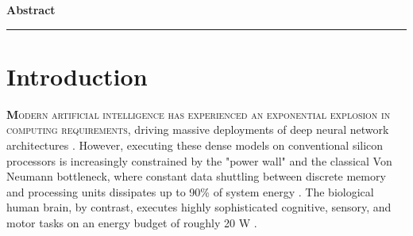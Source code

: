 \documentclass[11pt]{article}
\newcommand{\sectionlead}[2]{\noindent\lettrine[lines=2,lhang=0.08,nindent=0.12em]{\textcolor{IEEEblue}{\bfseries #1}}{\hspace{0.03em}#2}}
\begin{document}
\begin{titlepage}
    \thispagestyle{plain}
    \begin{center}
        \null
        \vspace{1.2cm}
        {\color{IEEEblue}\LARGE\bfseries Abstract\par}
        \vspace{0.25cm}
        {\color{IEEEorange}\rule{0.22\textwidth}{0.8pt}\par}
    \end{center}
    \vspace{0.45cm}

    \begin{abstract}
    The rise of modern deep learning has highlighted severe limitations within the traditional Von Neumann computer architecture, primarily governed by memory transfer bottlenecks and unsustainable power requirements. Neuromorphic architectures utilize Spiking Neural Networks (SNNs) to represent information as sparse, asynchronous temporal spikes, co-locating processing and memory within physical neuron and synapse models. This paper analyzes the core mathematical principles of SNNs, details the microelectronic physics of memristive devices representing physical synapses, and contrasts state-of-the-art brain-inspired hardware platforms, including IBM TrueNorth, Intel Loihi 1 \& 2, SpiNNaker 1 \& 2, and the brain-scale Intel Hala Point chassis. Furthermore, it discusses edge AI and robotic applications that demonstrate major gains in energy-delay product. Emerging frontiers such as integrated photonic neuromorphic circuits and quantum neuromorphic frameworks are reviewed alongside systematic bottlenecks, highlighting the technological roadmap for post-Moore computing.
    \end{abstract}

    \vfill
\end{titlepage}

\clearpage
\setcounter{page}{2}
\tableofcontents
\clearpage
\listoffigures
\clearpage
\listoftables
\clearpage
{}
\setcounter{page}{1}


\section{Introduction}
\sectionlead{M}{odern artificial intelligence has experienced an exponential explosion in computing requirements}, driving massive deployments of deep neural network architectures \cite{schuman2017survey}. However, executing these dense models on conventional silicon processors is increasingly constrained by the "power wall" and the classical Von Neumann bottleneck, where constant data shuttling between discrete memory and processing units dissipates up to 90\% of system energy \cite{schuman2017survey}. The biological human brain, by contrast, executes highly sophisticated cognitive, sensory, and motor tasks on an energy budget of roughly 20 W \cite{schuman2017survey,mead1990neuromorphic}. 
\end{document}
